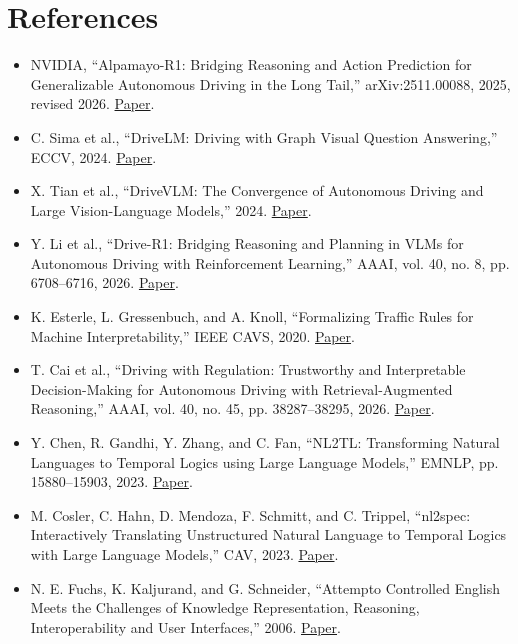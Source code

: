 \documentclass[11pt,a4paper]{article}
\begin{document}
\section*{References}

\begin{itemize}
\item [1] NVIDIA, “Alpamayo-R1: Bridging Reasoning and Action Prediction for Generalizable Autonomous Driving in the Long Tail,” arXiv:2511.00088, 2025, revised 2026. \href{\detokenize{https://arxiv.org/abs/2511.00088}}{Paper}.
\item [2] C. Sima et al., “DriveLM: Driving with Graph Visual Question Answering,” ECCV, 2024. \href{\detokenize{https://arxiv.org/abs/2312.14150}}{Paper}.
\item [3] X. Tian et al., “DriveVLM: The Convergence of Autonomous Driving and Large Vision-Language Models,” 2024. \href{\detokenize{https://arxiv.org/abs/2402.12289}}{Paper}.
\item [4] Y. Li et al., “Drive-R1: Bridging Reasoning and Planning in VLMs for Autonomous Driving with Reinforcement Learning,” AAAI, vol. 40, no. 8, pp. 6708–6716, 2026. \href{\detokenize{https://ojs.aaai.org/index.php/AAAI/article/view/37602}}{Paper}.
\item [5] K. Esterle, L. Gressenbuch, and A. Knoll, “Formalizing Traffic Rules for Machine Interpretability,” IEEE CAVS, 2020. \href{\detokenize{https://arxiv.org/abs/2007.00330}}{Paper}.
\item [6] T. Cai et al., “Driving with Regulation: Trustworthy and Interpretable Decision-Making for Autonomous Driving with Retrieval-Augmented Reasoning,” AAAI, vol. 40, no. 45, pp. 38287–38295, 2026. \href{\detokenize{https://ojs.aaai.org/index.php/AAAI/article/view/41168}}{Paper}.
\item [7] Y. Chen, R. Gandhi, Y. Zhang, and C. Fan, “NL2TL: Transforming Natural Languages to Temporal Logics using Large Language Models,” EMNLP, pp. 15880–15903, 2023. \href{\detokenize{https://aclanthology.org/2023.emnlp-main.985/}}{Paper}.
\item [8] M. Cosler, C. Hahn, D. Mendoza, F. Schmitt, and C. Trippel, “nl2spec: Interactively Translating Unstructured Natural Language to Temporal Logics with Large Language Models,” CAV, 2023. \href{\detokenize{https://arxiv.org/abs/2303.04864}}{Paper}.
\item [9] N. E. Fuchs, K. Kaljurand, and G. Schneider, “Attempto Controlled English Meets the Challenges of Knowledge Representation, Reasoning, Interoperability and User Interfaces,” 2006. \href{\detokenize{https://attempto.ifi.uzh.ch/site/pubs/papers/FLAIRS0601FuchsN.pdf}}{Paper}.
\end{itemize}
\end{document}
